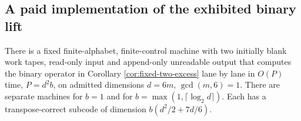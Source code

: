 \subsection{A paid implementation of the exhibited binary lift}

\begin{theorem}\label{thm:paid-lift}
\notformalized
There is a fixed finite-alphabet, finite-control machine with two initially
blank work tapes, read-only input and append-only unreadable output that
computes the binary operator in Corollary \ref{cor:fixed-two-excess}
lane by lane in $O(P)$ time, $P=d^2b$, on admitted dimensions $d=6m$,
$\gcd(m,6)=1$. There are separate machines for $b=1$ and for
$b=\max(1,\lceil\log_2d\rceil)$. Each has a transpose-correct subcode of
dimension $b(d^2/2+7d/6)$.
\end{theorem}
